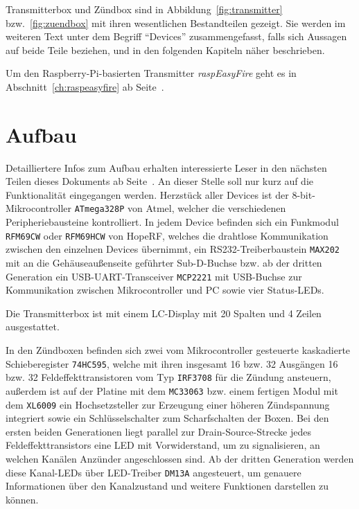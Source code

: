\documentclass[paper=a4, parskip, numbers=noenddot, toc=listof, headsepline]{scrbook}
\begin{document}
		Transmitterbox und Zündbox sind in Abbildung~\ref{fig:transmitter} bzw.~\ref{fig:zuendbox} mit ihren wesentlichen Bestandteilen gezeigt. Sie werden im weiteren Text unter dem Begriff \enquote{Devices} zusammengefasst, falls sich Aussagen auf beide Teile beziehen, und in den folgenden Kapiteln näher beschrieben.
		
		Um den Raspberry-Pi-basierten Transmitter \emph{raspEasyFire} geht es in Abschnitt~\ref{ch:raspeasyfire} ab Seite~\pageref{ch:raspeasyfire}.

		\section{Aufbau}

			Detailliertere Infos zum Aufbau erhalten interessierte Leser in den nächsten Teilen dieses Dokuments ab Seite~\pageref{part:dokumentation}. An dieser Stelle soll nur kurz auf die Funktionalität eingegangen werden. Herzstück aller Devices ist der 8-bit-Mikrocontroller \texttt{ATmega328P} von Atmel, welcher die verschiedenen Peripheriebausteine kontrolliert. In jedem Device befinden sich ein Funkmodul \texttt{RFM69CW} oder \texttt{RFM69HCW} von HopeRF, welches die drahtlose Kommunikation zwischen den einzelnen Devices übernimmt, ein RS232-Treiberbaustein \texttt{MAX202} mit an die Gehäuseaußenseite geführter Sub-D-Buchse bzw. ab der dritten Generation ein USB-UART-Transceiver \texttt{MCP2221} mit USB-Buchse zur Kommunikation zwischen Mikrocontroller und PC sowie vier Status-LEDs.

			Die Transmitterbox ist mit einem LC-Display mit 20 Spalten und 4 Zeilen ausgestattet.

			In den Zündboxen befinden sich zwei vom Mikrocontroller gesteuerte kaskadierte Schieberegister \texttt{74HC595}, welche mit ihren insgesamt 16 bzw. 32 Ausgängen 16 bzw. 32 Feldeffekttransistoren vom Typ \texttt{IRF3708} für die Zündung ansteuern, außerdem ist auf der Platine mit dem \texttt{MC33063} bzw. einem fertigen Modul mit dem \texttt{XL6009} ein Hochsetzsteller zur Erzeugung einer höheren Zündspannung integriert sowie ein Schlüsselschalter zum Scharfschalten der Boxen. Bei den ersten beiden Generationen liegt parallel zur Drain-Source-Strecke jedes Feldeffekttransistors eine LED mit Vorwiderstand, um zu signalisieren, an welchen Kanälen Anzünder angeschlossen sind. Ab der dritten Generation werden diese Kanal-LEDs über LED-Treiber \texttt{DM13A} angesteuert, um genauere Informationen über den Kanalzustand und weitere Funktionen darstellen zu können.
\end{document}
